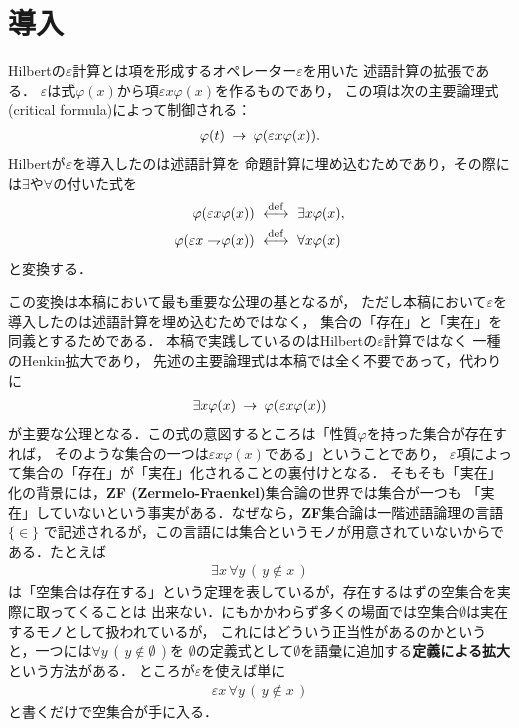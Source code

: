 \section{導入}
	Hilbert\cite{Hilbert}の$\varepsilon$計算とは項を形成するオペレーター$\varepsilon$を用いた
	述語計算の拡張である．
	$\varepsilon$は式$\varphi(x)$から項$\varepsilon x \varphi(x)$を作るものであり，
	この項は次の主要論理式(critical formula)によって制御される：
	\begin{align}
		\varphi(t) \hspace{0.25em}\rightarrow\hspace{0.25em} \varphi(\varepsilon x \varphi(x)).
	\end{align}
	Hilbertが$\varepsilon$を導入したのは述語計算を
	命題計算に埋め込むためであり，その際には$\exists$や$\forall$の付いた式を
	\begin{align}
		\varphi(\varepsilon x \varphi(x)) &\ \overset{\mathrm{def}}{\longleftrightarrow}\  \exists x \varphi(x), \\
		\varphi(\varepsilon x \rightharpoondown\hspace{-0.25em} \varphi(x)) &\ \overset{\mathrm{def}}{\longleftrightarrow}\  \forall x \varphi(x)
	\end{align}
	と変換する．
	
	この変換は本稿において最も重要な公理の基となるが，
	ただし本稿において$\varepsilon$を導入したのは述語計算を埋め込むためではなく，
	集合の「存在」と「実在」を同義とするためである．
	本稿で実践しているのはHilbertの$\varepsilon$計算ではなく
	一種のHenkin拡大であり，%
	先述の主要論理式は本稿では全く不要であって，代わりに
	\begin{align}
		\exists x \varphi(x) \hspace{0.25em}\rightarrow\hspace{0.25em} \varphi(\varepsilon x \varphi(x))
	\end{align}
	が主要な公理となる．この式の意図するところは「性質$\varphi$を持った集合が存在すれば，
	そのような集合の一つは$\varepsilon x \varphi(x)$である」ということであり，
	$\varepsilon$項によって集合の「存在」が「実在」化されることの裏付けとなる．
	そもそも「実在」化の背景には，{\bf ZF (Zermelo-Fraenkel)}集合論の世界では集合が一つも
	「実在」していないという事実がある．なぜなら，{\bf ZF}集合論は一階述語論理の言語$\{\in\}$
	で記述されるが，この言語には集合というモノが用意されていないからである．たとえば
	\begin{align}
		\exists x\, \forall y\, (\, y \notin x\, )
	\end{align}
	は「空集合は存在する」という定理を表しているが，存在するはずの空集合を実際に取ってくることは
	出来ない．にもかかわらず多くの場面では空集合$\emptyset$は実在するモノとして扱われているが，
	これにはどういう正当性があるのかというと，一つには$\forall y\, (\, y \notin \emptyset\, )$を
	$\emptyset$の定義式として$\emptyset$を語彙に追加する{\bf 定義による拡大}
	という方法がある．
	ところが$\varepsilon$を使えば単に
	\begin{align}
		\varepsilon x\, \forall y\, (\, y \notin x\, )
	\end{align}
	と書くだけで空集合が手に入る．
	
